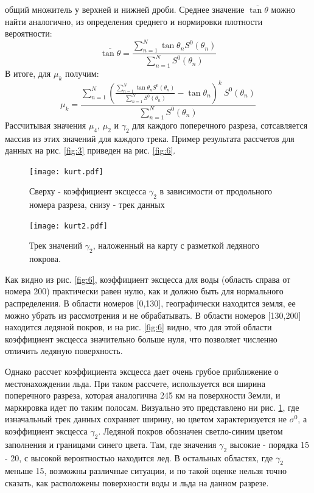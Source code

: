 общий множитель у верхней и нижней дроби. Среднее значение $\overline{\tan\theta}$ можно найти аналогично, из
определения среднего и нормировки плотности вероятности:
\begin{equation}
  \overline{\tan\theta} = \frac{\sum \limits_{n = 1}^{N} \tan \theta_n S^0(\theta_n) }{\sum \limits_{n = 1}^{N} S^0(\theta_n)}
  \label{eq:18}
\end{equation}
В итоге, для $\mu_k$ получим:
\begin{equation}
  \mu_k = \frac{\sum \limits_{n = 1}^{N} (\frac{\sum \limits_{n = 1}^{N} \tan \theta_n S^0(\theta_n) }{\sum \limits_{n = 1}^{N} S^0(\theta_n)} - \tan \theta_n)^k~ S^0(\theta_n)}{\sum \limits_{n = 1}^{N} S^0(\theta_n) }
  \label{eq:19}
\end{equation}
Рассчитывая значения $\mu_4$, $\mu_2$ и $\gamma_2$ для каждого поперечного разреза, сотсавляется массив из этих значений для
каждого трека. Пример результата рассчетов для данных на рис. \ref{fig:3} приведен на рис. \ref{fig:6}.

\begin{figure}[h!]
  \centering
  \begin{minipage}{0.50\linewidth}
    \centering
    \texttt{[image: kurt.pdf]}
    \caption{Сверху - коэффициент эксцесса $\gamma_2$ в зависимости от продольного номера разреза, снизу - трек данных}
    \label{fig:6}
  \end{minipage}
  \begin{minipage}{0.40\linewidth}
    \centering
    \texttt{[image: kurt2.pdf]}
    \caption{Трек значений $\gamma_2$, наложенный на карту с разметкой ледяного покрова.}
    \label{fig:7}
  \end{minipage}
\end{figure}


Как видно из рис. \ref{fig:6}, коэффициент эксцесса для воды (область справа от номера 200) практически равен нулю, как
и должно быть для нормального распределения. В области номеров [0,130], географически находится
земля, ее можно убрать из рассмотрения и не обрабатывать. В области номеров [130,200] находится ледяной покров, и на  рис. \ref{fig:6}
видно, что для этой области коэффициент эксцесса значительно больше нуля, что позволяет численно отличить ледяную поверхность.

Однако рассчет коэффициента эксцесса дает очень грубое приближение о местонахождении льда. При таком рассчете,
используется вся ширина поперечного разреза, которая аналогична 245 км на поверхности Земли, и маркировка идет по
таким полосам. Визуально это представлено ни рис. \ref{fig:7}, где изначальный трек данных сохраняет ширину, но цветом
характеризуется не $\sigma^0$, а коэффициент эксцесса $\gamma_2$. Ледяной покров обозначен светло-синим цветом заполнения и
границами синего цвета. Там, где значения $\gamma_2$ высокие - порядка 15 - 20, с высокой вероятностью находится лед. В
остальных областях, где $\gamma_2$ меньше 15, возможны различные ситуации, и по такой оценке нельзя точно сказать, как
расположены поверхности воды и льда на данном разрезе. 




